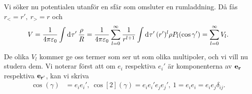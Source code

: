 Vi söker nu potentialen utanför en sfär som omsluter en rumladdning. Då fås $r_{<} = r',\ r_{>} = r$ och
\begin{align*}
	V = \frac{1}{4\pi\varepsilon_{0}}\int\limits_{}^{}\dd[]{\tau'}\frac{\rho}{R} = \frac{1}{4\pi\varepsilon_{0}}\sum\limits_{l = 0}^{\infty}\frac{1}{r^{l + 1}}\int\limits_{}^{}\dd[]{\tau'}(r')^{l}\rho P_{l}(\cos{\gamma'}) = \sum\limits_{l = 0}^{\infty}V_{l}.
\end{align*}
De olika $V_{l}$ kommer ge oss termer som ser ut som olika multipoler, och vi vill nu studera dem. Vi noterar först att om $e_{i}$ respektiva $e_{i}'$ är komponenterna av $\vb{e}_{\vb{r}}$ respektiva $\vb{e}_{\vb{r'}}$, kan vi skriva
\begin{align*}
	\cos(\gamma) &= e_{i}e_{i}',\ \cos[2](\gamma) = e_{i}e_{i}'e_{j}e_{j}',\ 1 = e_{i}e_{i} = e_{i}e_{j}\delta_{ij}.
\end{align*}

